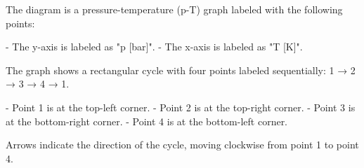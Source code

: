 The diagram is a pressure-temperature (p-T) graph labeled with the following points:  

- The y-axis is labeled as "p [bar]".  
- The x-axis is labeled as "T [K]".  

The graph shows a rectangular cycle with four points labeled sequentially:  
1 → 2 → 3 → 4 → 1.  

- Point 1 is at the top-left corner.  
- Point 2 is at the top-right corner.  
- Point 3 is at the bottom-right corner.  
- Point 4 is at the bottom-left corner.  

Arrows indicate the direction of the cycle, moving clockwise from point 1 to point 4.